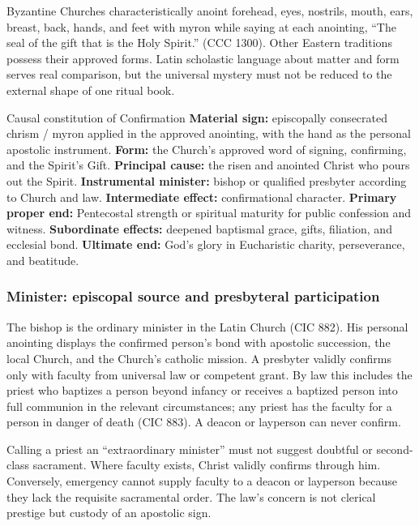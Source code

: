 Byzantine Churches characteristically anoint forehead, eyes, nostrils, mouth, ears, breast, back, hands, and feet with myron while saying at each anointing, ``The seal of the gift that is the Holy Spirit.'' (CCC 1300). Other Eastern traditions possess their approved forms. Latin scholastic language about matter and form serves real comparison, but the universal mystery must not be reduced to the external shape of one ritual book.

\begin{massbox}{Causal constitution of Confirmation}
\textbf{Material sign:} episcopally consecrated chrism / myron applied in the approved anointing, with the hand as the personal apostolic instrument. \textbf{Form:} the Church's approved word of signing, confirming, and the Spirit's Gift. \textbf{Principal cause:} the risen and anointed Christ who pours out the Spirit. \textbf{Instrumental minister:} bishop or qualified presbyter according to Church and law. \textbf{Intermediate effect:} confirmational character. \textbf{Primary proper end:} Pentecostal strength or spiritual maturity for public confession and witness. \textbf{Subordinate effects:} deepened baptismal grace, gifts, filiation, and ecclesial bond. \textbf{Ultimate end:} God's glory in Eucharistic charity, perseverance, and beatitude.
\end{massbox}

\subsubsection{Minister: episcopal source and presbyteral participation}

The bishop is the ordinary minister in the Latin Church (CIC 882). His personal anointing displays the confirmed person's bond with apostolic succession, the local Church, and the Church's catholic mission. A presbyter validly confirms only with faculty from universal law or competent grant. By law this includes the priest who baptizes a person beyond infancy or receives a baptized person into full communion in the relevant circumstances; any priest has the faculty for a person in danger of death (CIC 883). A deacon or layperson can never confirm.

Calling a priest an ``extraordinary minister'' must not suggest doubtful or second-class sacrament. Where faculty exists, Christ validly confirms through him. Conversely, emergency cannot supply faculty to a deacon or layperson because they lack the requisite sacramental order. The law's concern is not clerical prestige but custody of an apostolic sign.

